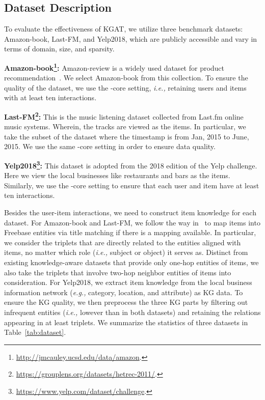 \documentclass[sigconf]{acmart}
\newcommand{\ie}{\emph{i.e., }}
\newcommand{\eg}{\emph{e.g., }}
\theoremstyle{definition}
\begin{document}
\subsection{Dataset Description}

To evaluate the effectiveness of KGAT, we utilize three benchmark datasets: Amazon-book, Last-FM, and Yelp2018, which are publicly accessible and vary in terms of domain, size, and sparsity.


\vspace{2px}
\noindent\textbf{Amazon-book\footnote{\url{http://jmcauley.ucsd.edu/data/amazon}.}:}
Amazon-review is a widely used dataset for product recommendation~\cite{amazon-review}.
We select Amazon-book from this collection.
To ensure the quality of the dataset, we use the -core setting, \ie retaining users and items with at least ten interactions.

\vspace{2px}
\noindent\textbf{Last-FM\footnote{\url{https://grouplens.org/datasets/hetrec-2011/}.}:}
This is the music listening dataset collected from Last.fm online music systems.
Wherein, the tracks are viewed as the items.
In particular, we take the subset of the dataset where the timestamp is from Jan, 2015 to June, 2015.
We use the same -core setting in order to ensure data quality.

\vspace{2px}
\noindent\textbf{Yelp2018\footnote{\url{https://www.yelp.com/dataset/challenge}.}:}
This dataset is adopted from the 2018 edition of the Yelp challenge.
Here we view the local businesses like restaurants and bars as the items.
Similarly, we use the -core setting to ensure that each user and item have at least ten interactions.

Besides the user-item interactions, we need to construct item knowledge for each dataset.
For Amazon-book and Last-FM, we follow the way in~\cite{KB4Rec} to map items into Freebase entities via title matching if there is a mapping available.
In particular, we consider the triplets that are directly related to the entities aligned with items, no matter which role (\ie subject or object) it serves as.
Distinct from existing knowledge-aware datasets that provide only one-hop entities of items, we also take the triplets that involve two-hop neighbor entities of items into consideration.
For Yelp2018, we extract item knowledge from the local business information network (\eg category, location, and attribute) as KG data.
To ensure the KG quality, we then preprocess the three KG parts by filtering out infrequent entities (\ie lowever than  in both datasets) and retaining the relations appearing in at least  triplets.
We summarize the statistics of three datasets in Table~\ref{tab:dataset}.
\end{document}
